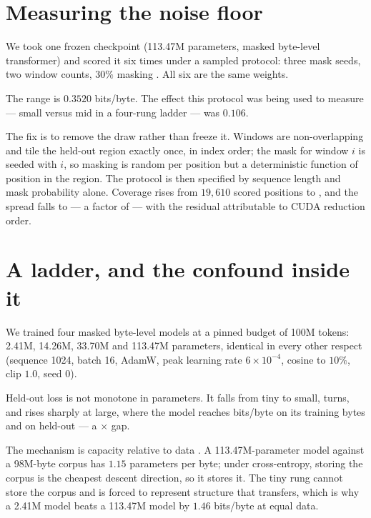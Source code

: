 \documentclass[11pt]{article}
\begin{document}
\section{Measuring the noise floor}
\label{sec:noise}

We took one frozen checkpoint (113.47M parameters, masked byte-level transformer)
and scored it six times under a sampled protocol: three mask seeds, two window
counts, $30\%$ masking \citep{devlin2019bert,portes2023mosaicbert}. All six are the same weights.



The range is $0.3520$ bits/byte. The effect this protocol was being used to
measure --- small versus mid in a four-rung ladder --- was $0.106$.

The fix is to remove the draw rather than freeze it. Windows are non-overlapping
and tile the held-out region exactly once, in index order; the mask for window $i$
is seeded with $i$, so masking is random per position but a deterministic function
of position in the region. The protocol is then specified by sequence length and
mask probability alone. Coverage rises from $19{,}610$ scored positions to
\ProtoPositions{}, and the spread falls to \ProtoNewSpread{} --- a factor of
\ProtoRatio{} --- with the residual attributable to CUDA reduction order.

\section{A ladder, and the confound inside it}
\label{sec:ladder}

We trained four masked byte-level models at a pinned budget of 100M tokens:
2.41M, 14.26M, 33.70M and 113.47M parameters, identical in every other respect
(sequence 1024, batch 16, AdamW, peak learning rate $6\times10^{-4}$, cosine to
$10\%$, clip $1.0$, seed 0).



Held-out loss is not monotone in parameters. It falls from tiny to small, turns,
and rises sharply at large, where the model reaches \LargeTrainBits{} bits/byte on
its training bytes and \LargeHeldout{} on held-out --- a \LargeGap$\times$ gap.

The mechanism is capacity relative to data \citep{zhang2017rethinking}. A 113.47M-parameter model against a
98M-byte corpus has $1.15$ parameters per byte; under cross-entropy, storing the
corpus is the cheapest descent direction, so it stores it. The tiny rung cannot
store the corpus and is forced to represent structure that transfers, which is why
a 2.41M model beats a 113.47M model by $1.46$ bits/byte at equal data.
\end{document}
